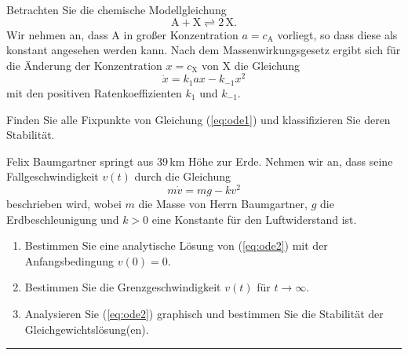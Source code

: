 \documentclass[11pt,a4paper]{article}
\begin{document}




\begin{aufg}[Autokatalyse]
 Betrachten Sie die chemische Modellgleichung
 \begin{equation*}
  \textrm{A} + \textrm{X} \rightleftharpoons 2\, \textrm{X}.
 \end{equation*}
 Wir nehmen an, dass $\textrm{A}$ in großer Konzentration $a=c_{\textrm{A}}$
 vorliegt, so dass diese als konstant angesehen werden kann.
 Nach dem Massenwirkungsgesetz ergibt sich für die Änderung der Konzentration
 $x=c_{\textrm{X}}$ von $\textrm{X}$ die Gleichung
 \begin{equation}\label{eq:ode1}
  \dot{x} = k_1 a x - k_{-1} x^2
 \end{equation}
 mit den positiven Ratenkoeffizienten $k_1$ und $k_{-1}$.
 \medskip
 
 Finden Sie alle Fixpunkte von Gleichung (\ref{eq:ode1}) und klassifizieren Sie deren
 Stabilität.
\end{aufg}

\bigskip%

\begin{aufg}[Fallschirmsprung]
 Felix Baumgartner springt aus 39\,km Höhe zur Erde. Nehmen wir an, dass seine
 Fallgeschwindigkeit $v(t)$ durch die Gleichung
 \begin{equation}\label{eq:ode2}
  m \dot{v} = mg - kv^2
 \end{equation}
 beschrieben wird, wobei $m$ die Masse von Herrn Baumgartner, $g$ die
 Erdbeschleunigung und $k>0$ eine Konstante für den Luftwiderstand ist.
 \begin{enumerate}
  \item Bestimmen Sie eine analytische Lösung von (\ref{eq:ode2}) mit der
        Anfangsbedingung $v(0)=0$.
  \item Bestimmen Sie die Grenzgeschwindigkeit $v(t)$ für $t\rightarrow\infty$.
  \item Analysieren Sie (\ref{eq:ode2}) graphisch und bestimmen Sie die
        Stabilität der Gleichgewichtslösung(en).
 \end{enumerate}

\end{aufg}


\bigskip
\hrule

\end{document}
